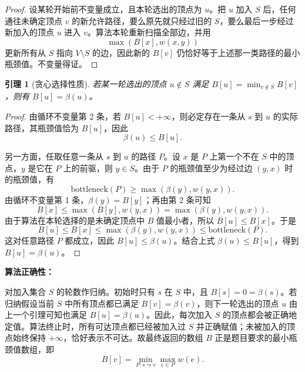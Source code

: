 ﻿\documentclass[12pt,a4paper]{article}
\newtheorem{lemma}{引理}
\begin{document}
\begin{answerbox}
\begin{proof}
设某轮开始前不变量成立，且本轮选出的顶点为 $u$。把 $u$ 加入 $S$ 后，任何通往未确定顶点 $v$ 的新允许路径，要么原先就只经过旧的 $S$，要么最后一步经过新加入的顶点 $u$ 进入 $v$。算法本轮重新扫描全部边，并用
\[
\max(B[x], w(x,y))
\]
更新所有从 $S$ 指向 $V \setminus S$ 的边，因此新的 $B[v]$ 仍恰好等于上述那一类路径的最小瓶颈值。不变量得证。
\end{proof}

\begin{lemma}[贪心选择性质]
若某一轮选出的顶点 $u \notin S$ 满足 $B[u] = \min_{v \notin S} B[v]$，则有 $B[u] = \beta(u)$。
\end{lemma}

\begin{proof}
由循环不变量第 2 条，若 $B[u] < +\infty$，则必定存在一条从 $s$ 到 $u$ 的实际路径，其瓶颈值恰为 $B[u]$，因此
\[
\beta(u) \leq B[u].
\]

另一方面，任取任意一条从 $s$ 到 $u$ 的路径 $P$。设 $x$ 是 $P$ 上第一个不在 $S$ 中的顶点，$y$ 是它在 $P$ 上的前驱，则 $y \in S$。由于 $P$ 的瓶颈值至少为经过边 $(y,x)$ 时的瓶颈值，有
\[
\text{bottleneck}(P) \geq \max(\beta(y), w(y,x)).
\]
由循环不变量第 1 条，$\beta(y)=B[y]$；再由第 2 条可知
\[
B[x] \leq \max(B[y], w(y,x)) = \max(\beta(y), w(y,x)).
\]
由于算法在本轮选择的是未确定顶点中 $B$ 值最小者，所以 $B[u] \leq B[x]$。于是
\[
B[u] \leq B[x] \leq \max(\beta(y), w(y,x)) \leq \text{bottleneck}(P).
\]
这对任意路径 $P$ 都成立，因此 $B[u] \leq \beta(u)$。结合上式 $\beta(u) \leq B[u]$，得到 $B[u] = \beta(u)$。
\end{proof}

\textbf{算法正确性：}

对加入集合 $S$ 的轮数作归纳。初始时只有 $s$ 在 $S$ 中，且 $B[s]=0=\beta(s)$。若归纳假设当前 $S$ 中所有顶点都已满足 $B[v]=\beta(v)$，则下一轮选出的顶点 $u$ 由上一个引理可知也满足 $B[u]=\beta(u)$。因此，每次加入 $S$ 的顶点都会被正确地定值。算法终止时，所有可达顶点都已经被加入过 $S$ 并正确赋值；未被加入的顶点始终保持 $+\infty$，恰好表示不可达。故最终返回的数组 $B$ 正是题目要求的最小瓶颈值数组，即
\[
B[v] = \min_{P:s\leadsto v}\max_{e\in P} w(e).
\]
\end{answerbox}
\end{document}
